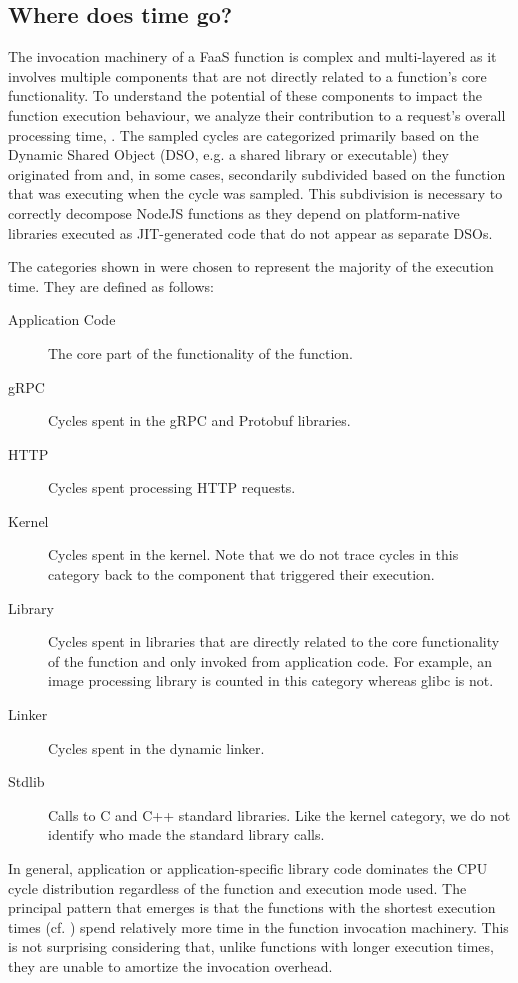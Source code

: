 \subsection{Where does time go?}
\label{wosc:subsec:time}

The invocation machinery of a FaaS function is complex and multi-layered as it involves multiple components that are not directly related to a function's core functionality. To understand the potential of these components to impact the function execution behaviour, we analyze their contribution to a request's overall processing time, . The sampled cycles are categorized primarily based on the Dynamic Shared Object (DSO, e.g. a shared library or executable) they originated from and, in some cases, secondarily subdivided based on the function that was executing when the cycle was sampled. This subdivision is necessary to correctly decompose NodeJS functions as they depend on platform-native libraries executed as JIT-generated code that do not appear as separate DSOs.

The categories shown in   were chosen to represent the majority of the execution time. They are defined as follows:
\noindent
\begin{description}
\item[Application Code]  The core part of the functionality of the function.
\item [gRPC] Cycles spent in the gRPC and Protobuf libraries.
\item [HTTP] Cycles spent processing HTTP requests.
\item [Kernel] Cycles spent in the kernel. Note that we do not trace cycles in this category back to the component that triggered their execution.
\item[Library] Cycles spent in libraries that are directly related to the core functionality of the function and only invoked from application code. For example, an image processing library is counted in this category whereas glibc is not.
\item[Linker] Cycles spent in the dynamic linker.
\item[Stdlib] Calls to C and C++ standard libraries. Like the kernel category, we do not identify who made the standard library calls.
  \end{description}

In general, application or application-specific library code dominates the CPU cycle distribution regardless of the function and execution mode used. The principal pattern that emerges is that the functions with the shortest execution times (cf. ) spend relatively more time in the function invocation machinery. This is not surprising considering that, unlike functions with longer execution times, they are unable to amortize the invocation overhead.

